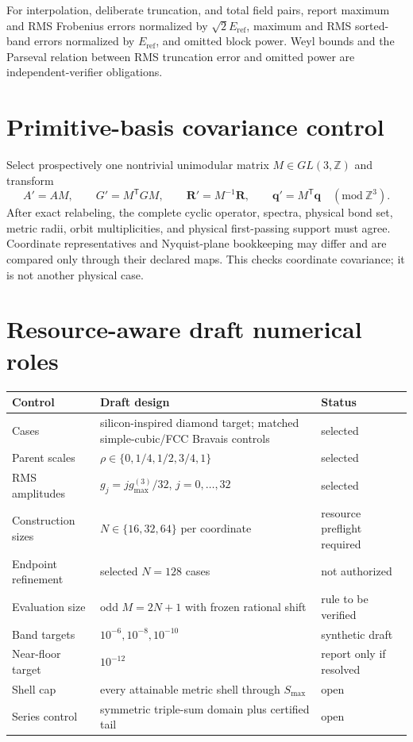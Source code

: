 \documentclass[11pt]{article}
\newcommand{\Z}{\mathbb Z}
\begin{document}
For interpolation, deliberate truncation, and total field pairs, report maximum and RMS
Frobenius errors normalized by $\sqrt2E_{\mathrm{ref}}$, maximum and RMS sorted-band errors normalized
by $E_{\mathrm{ref}}$, and omitted block power.  Weyl bounds and the Parseval relation between RMS
truncation error and omitted power are independent-verifier obligations.

\section{Primitive-basis covariance control}

Select prospectively one nontrivial unimodular matrix $M\in GL(3,\Z)$ and transform
\begin{equation}
 A'=AM,
 \qquad G'=M^{\mathsf T}GM,
 \qquad \mathbf R'=M^{-1}\mathbf R,
 \qquad \mathbf q'=M^{\mathsf T}\mathbf q
 \quad (\mathrm{mod}\ \Z^3).
\end{equation}
After exact relabeling, the complete cyclic operator, spectra, physical bond set, metric
radii, orbit multiplicities, and physical first-passing support must agree.  Coordinate
representatives and Nyquist-plane bookkeeping may differ and are compared only through
their declared maps.  This checks coordinate covariance; it is not another physical
case.

\section{Resource-aware draft numerical roles}

\begin{table}[htbp]
\centering
\begin{tabular}{>{\raggedright\arraybackslash}p{}
                  >{\raggedright\arraybackslash}p{}
                  >{\raggedright\arraybackslash}p{}}
\toprule
Control & Draft design & Status\\
\midrule
Cases & silicon-inspired diamond target; matched simple-cubic/FCC Bravais controls & selected\\
Parent scales & $\rho\in\{0,1/4,1/2,3/4,1\}$ & selected\\
RMS amplitudes & $g_j=jg_{\max}^{(3)}/32$, $j=0,\ldots,32$ & selected\\
Construction sizes & $N\in\{16,32,64\}$ per coordinate & resource preflight required\\
Endpoint refinement & selected $N=128$ cases & not authorized\\
Evaluation size & odd $M=2N+1$ with frozen rational shift & rule to be verified\\
Band targets & $10^{-6},10^{-8},10^{-10}$ & synthetic draft\\
Near-floor target & $10^{-12}$ & report only if resolved\\
Shell cap & every attainable metric shell through $S_{\max}$ & open\\
Series control & symmetric triple-sum domain plus certified tail & open\\
\bottomrule
\end{tabular}
\end{table}
\end{document}
